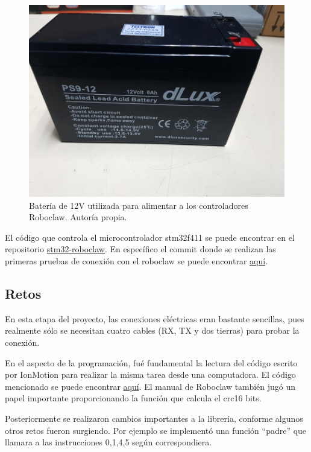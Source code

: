 \begin{figure}[h!]
\centering
\includegraphics[scale=0.4]{imagenes/bateria.jpg}
\caption{Batería de 12V utilizada para alimentar a los controladores Roboclaw. Autoría propia.}
\label{F:bateria}
\end{figure}

El código que controla el microcontrolador stm32f411 se puede encontrar en el repositorio \href{https://github.com/arcoslab/stm32-roboclaw/}{stm32-roboclaw}. En específico el commit donde se realizan las primeras pruebas de conexión con el roboclaw se puede encontrar \href{https://github.com/arcoslab/stm32-roboclaw/commit/a6550243ac7c911bdcf5b3bf379690d89427ade5}{aquí}.

\subsection{Retos}

En esta etapa del proyecto, las conexiones eléctricas eran bastante sencillas, pues realmente sólo se necesitan cuatro cables (RX, TX y dos tierras) para probar la conexión.

En el aspecto de la programación, fué fundamental la lectura del código escrito por IonMotion para realizar la misma tarea desde una computadora. El código mencionado se puede encontrar \href{http://www.basicmicro.com/downloads}{aquí}. El manual de Roboclaw también jugó un papel importante proporcionando la función que calcula el crc16 bits.

Posteriormente se realizaron cambios importantes a la librería, conforme algunos otros retos fueron surgiendo. Por ejemplo se implementó una función ``padre'' que llamara a las instrucciones 0,1,4,5 según correspondiera.

